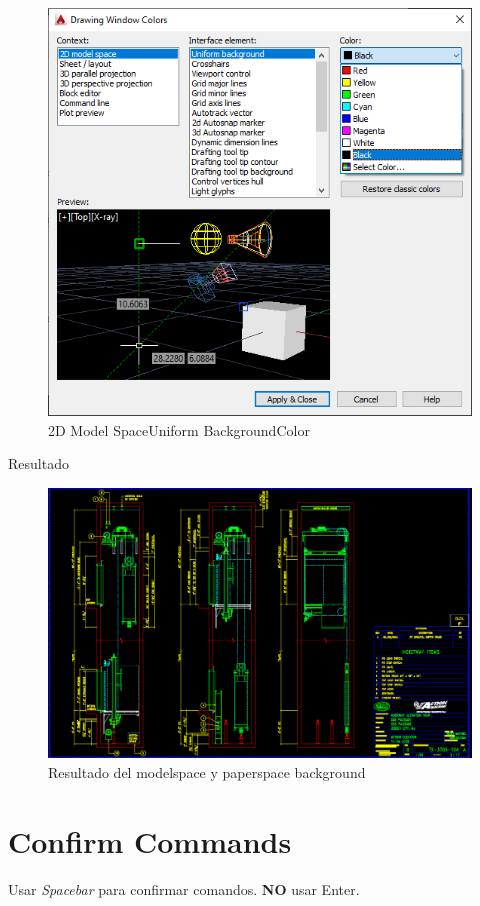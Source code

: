 \documentclass{report}
\begin{document}
\begin{figure}[H]
	\centering
	\includegraphics[width=0.75\linewidth, height=0.5\textheight,keepaspectratio]{Imagenes/autocad_background_03}
	\caption{2D Model Space\textrightarrow Uniform Background\textrightarrow Color}
	\label{fig:autocadbackground03}
\end{figure}

\clearpage

{\LARGE Resultado}

\begin{figure}[H]
	\centering
	\includegraphics[width=0.65\linewidth, height=0.5\textheight,keepaspectratio]{Imagenes/autocad_background_04}
	\caption{Resultado del modelspace y paperspace background}
	\label{fig:autocadbackground04}
\end{figure}

\chapter{Confirm Commands}

Usar \emph{Spacebar} para confirmar comandos. \textbf{NO} usar Enter.
\end{document}
